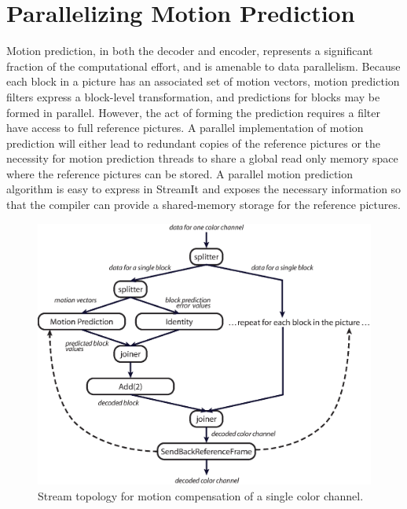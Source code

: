 \section{Parallelizing Motion Prediction}
\label{sec:parallelmotion}

Motion prediction, in both the decoder and encoder, represents a significant fraction of the 
computational effort, and is amenable to data parallelism. Because each block in a 
picture has an associated set of motion vectors, motion prediction filters 
express a block-level transformation, and predictions for blocks may be formed in 
parallel. However, the act of forming the prediction requires a filter have access to 
full reference pictures. A parallel implementation of motion prediction will either lead 
to redundant copies of the reference pictures or the necessity for motion prediction 
threads to share a global read only memory space where the reference pictures can be stored. 
A parallel motion prediction algorithm is easy to express in StreamIt and exposes the 
necessary information so that the compiler can provide a shared-memory storage for the 
reference pictures.

\begin{figure}[h]
  \begin{center}
    \includegraphics[scale=0.7, angle=0]{./motion_compensation.eps}
    \caption{Stream topology for motion compensation of a single color channel.}
    \label{fig:motion_prediction_parallel}
  \end{center}
\end{figure}

